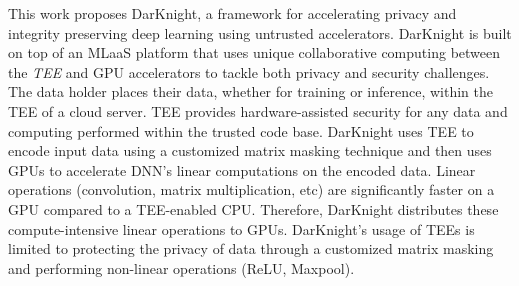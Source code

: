 This work proposes DarKnight, a framework for accelerating privacy and integrity preserving deep learning using untrusted accelerators. DarKnight is built on top of an MLaaS platform that uses unique collaborative computing between the \emph{TEE} and GPU accelerators to tackle both privacy and security challenges. The data holder places their data, whether for training or inference, within the TEE of a cloud server. TEE provides hardware-assisted security for any data and computing performed within the trusted code base. %
DarKnight uses TEE to encode input data using a customized matrix masking technique and then uses GPUs to accelerate DNN's linear computations on the encoded data. %
Linear operations (convolution, matrix multiplication, etc) are significantly faster on a GPU compared to a TEE-enabled CPU. Therefore, DarKnight distributes these compute-intensive linear operations to GPUs. DarKnight's usage of TEEs is limited to protecting the privacy of data through a customized matrix masking and performing non-linear operations (ReLU, Maxpool). 


